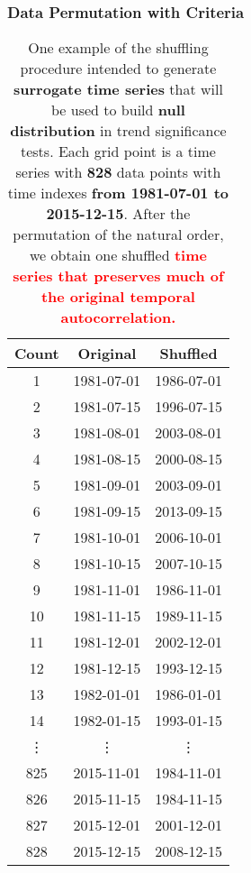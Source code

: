 \documentclass[11pt]{beamer}
\begin{document}
\begin{frame}[fragile]
  \frametitle{\normalsize{\textbf{
    Data Permutation with Criteria
  }}} 

  \tiny{  

    \begin{table}[h!]
      \centering
      \caption*{\tiny \textbullet \: One example of the shuffling procedure intended 
      to generate \textbf{surrogate time series} that will be used to build 
      \textbf{null distribution} in trend significance tests. Each grid point 
      is a time series with \textbf{828} data points with time indexes 
      \textbf{from 1981-07-01 to 2015-12-15}. After the permutation of
      the natural order, we obtain one shuffled \textbf{\textcolor{red}{
        time series that preserves much of the original temporal 
        autocorrelation.}}}
      \begin{tabular}{|c||c|c|}
        \hline
        \textbf{Count} & \textbf{Original} & \textbf{Shuffled} \\ \hline \hline
        1 & 1981-07-01 & 1986-07-01 \\ \hline
        2 & 1981-07-15 & 1996-07-15 \\ \hline
        3 & 1981-08-01 & 2003-08-01 \\ \hline
        4 & 1981-08-15 & 2000-08-15 \\ \hline
        5 & 1981-09-01 & 2003-09-01 \\ \hline
        6 & 1981-09-15 & 2013-09-15 \\ \hline
        7 & 1981-10-01 & 2006-10-01 \\ \hline
        8 & 1981-10-15 & 2007-10-15 \\ \hline
        9 & 1981-11-01 & 1986-11-01 \\ \hline
        10 & 1981-11-15 & 1989-11-15 \\ \hline
        11 & 1981-12-01 & 2002-12-01 \\ \hline
        12 & 1981-12-15 & 1993-12-15 \\ \hline
        13 & 1982-01-01 & 1986-01-01 \\ \hline
        14 & 1982-01-15 & 1993-01-15 \\ \hline
        \vdots & \vdots & \vdots \\ \hline
        825 & 2015-11-01 & 1984-11-01 \\ \hline
        826 & 2015-11-15 & 1984-11-15 \\ \hline
        827 & 2015-12-01 & 2001-12-01 \\ \hline
        828 & 2015-12-15 & 2008-12-15 \\ \hline
      \end{tabular}
      \label{tab:shuffle}
    \end{table}

  }
\end{frame}
\end{document}

